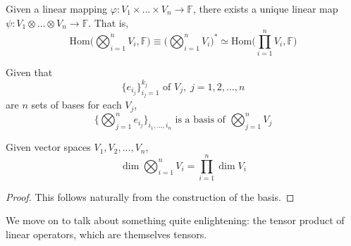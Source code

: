  \begin{proposition}
  Given a linear mapping $\varphi: V_1 \times ... \times V_n \longrightarrow \mathbb{F}$, there exists a unique linear map $\psi: V_1 \otimes ... \otimes V_n \longrightarrow \mathbb{F}$. That is, 
  \[\text{Hom}\Big( \bigotimes_{i=1}^n V_i, \mathbb{F} \Big) \equiv \bigg( \bigotimes_{i=1}^n V_i \bigg)^* \simeq \text{Hom}\Big(\prod_{i=1}^n V_i, \mathbb{F}\Big)\]
  \end{proposition}

  \begin{definition}
  Given that 
  \[ \{ e_{i_{j}}\}_{i_{j}=1}^{k_{j}} \text{ of } V_{j},\; j = 1, 2, ..., n\]
  are $n$ sets of bases for each $V_{j}$, 
  \[ \{ \bigotimes_{j=1}^{n} e_{i_{j}} \}_{i_{1}, ..., i_{n}} \text{ is a basis of } \bigotimes_{j=1}^{n} V_{j}\]
  \end{definition}

  \begin{proposition}
  Given vector spaces $V_1, V_2, ..., V_n$, 
  \[ \dim \bigotimes_{i=1}^{n} V_i = \prod_{i=1}^{n} \dim V_{i}\]
  \end{proposition}
  \begin{proof}
  This follows naturally from the construction of the basis.
  \end{proof}

  We move on to talk about something quite enlightening: the tensor product of linear operators, which are themselves tensors. 

